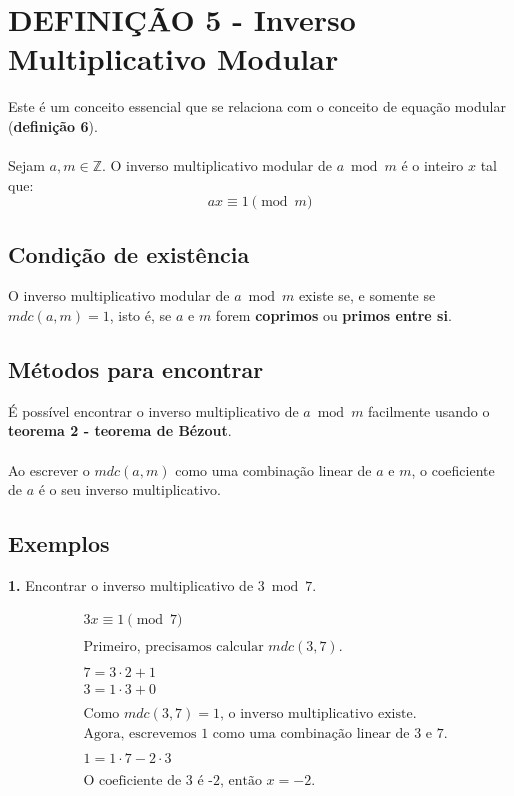 \section*{DEFINIÇÃO 5 - Inverso Multiplicativo Modular}
Este é um conceito essencial que se relaciona com o conceito de equação modular (\textbf{definição 6}).\\\\
Sejam $a,m \in \mathbb{Z}$. O inverso multiplicativo modular de $a \bmod m$ é o inteiro $x$ tal que:
\[
    ax \equiv 1 \pmod m
\]

\subsection*{Condição de existência}
O inverso multiplicativo modular de $a \bmod m$ existe se, e somente se $mdc(a,m) = 1$, isto é, se $a$ e $m$ forem \textbf{coprimos} ou \textbf{primos entre si}.\\

\subsection*{Métodos para encontrar}
É possível encontrar o inverso multiplicativo de $a \bmod m$ facilmente usando o \textbf{teorema 2 - teorema de Bézout}.
\\\\Ao escrever o $mdc(a,m)$ como uma combinação linear de $a$ e $m$, o coeficiente de $a$ é o seu inverso multiplicativo.

\subsection*{Exemplos}
\textbf{1.} Encontrar o inverso multiplicativo de $3 \bmod 7$.

\begin{align*}
     & 3x \equiv 1 \pmod 7                                             \\
    \\
     & \text{Primeiro, precisamos calcular $mdc(3,7)$.}                \\
    \\
     & 7 = 3 \cdot 2 + 1                                               \\
     & 3 = 1 \cdot 3 + 0                                               \\
    \\
     & \text{Como $mdc(3,7) = 1$, o inverso multiplicativo existe.}    \\
     & \text{Agora, escrevemos 1 como uma combinação linear de 3 e 7.} \\
    \\
     & 1 = 1 \cdot 7 - 2 \cdot 3                                       \\
    \\
     & \text{O coeficiente de 3 é -2, então $x = -2$.}
\end{align*}

